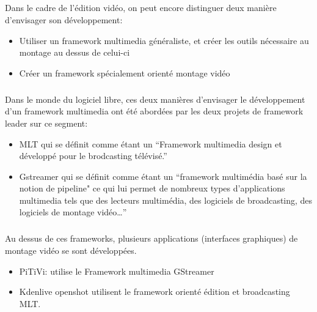 \subparagraph{}

Dans le cadre de l'édition vidéo, on peut encore distinguer deux
manière d'envisager son développement:

\begin {itemize}

  \item {Utiliser un framework multimedia généraliste, et créer les
  outils nécessaire
         au montage au dessus de celui-ci} %

  \item {Créer un framework spécialement orienté montage vidéo}

\end {itemize}

\subparagraph{}

Dans le monde du logiciel libre, ces deux manières d'envisager le
développement d'un framework multimedia ont été abordées par les
deux projets de framework leader sur ce segment:

\begin {itemize}

  \item {MLT qui se définit comme étant un ``Framework multimedia design
    et développé pour le brodcasting télévisé.''}

  \item {Gstreamer qui se définit comme étant un ``framework multimédia
    basé sur la notion de pipeline" ce qui lui permet de nombreux types
    d'applications multimedia tels que des lecteurs multimédia, des
    logiciels de broadcasting, des logiciels de montage vidéo\ldots''}

\end {itemize}

\subparagraph {}

Au dessus de ces frameworks, plusieurs applications (interfaces graphiques)
de montage vidéo se sont développées.

\begin {itemize}

  \item {PiTiVi: utilise le Framework multimedia GStreamer}

  \item {Kdenlive openshot utilisent le framework
  orienté édition et broadcasting MLT.}

\end {itemize}

